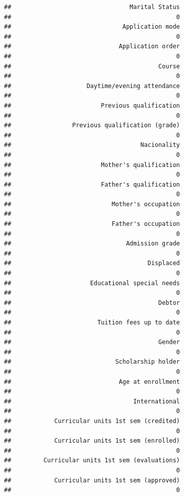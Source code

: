 \documentclass[
]{article}
\begin{document}
\begin{verbatim}
##                                 Marital Status 
##                                              0 
##                               Application mode 
##                                              0 
##                              Application order 
##                                              0 
##                                         Course 
##                                              0 
##                     Daytime/evening attendance 
##                                              0 
##                         Previous qualification 
##                                              0 
##                 Previous qualification (grade) 
##                                              0 
##                                    Nacionality 
##                                              0 
##                         Mother's qualification 
##                                              0 
##                         Father's qualification 
##                                              0 
##                            Mother's occupation 
##                                              0 
##                            Father's occupation 
##                                              0 
##                                Admission grade 
##                                              0 
##                                      Displaced 
##                                              0 
##                      Educational special needs 
##                                              0 
##                                         Debtor 
##                                              0 
##                        Tuition fees up to date 
##                                              0 
##                                         Gender 
##                                              0 
##                             Scholarship holder 
##                                              0 
##                              Age at enrollment 
##                                              0 
##                                  International 
##                                              0 
##            Curricular units 1st sem (credited) 
##                                              0 
##            Curricular units 1st sem (enrolled) 
##                                              0 
##         Curricular units 1st sem (evaluations) 
##                                              0 
##            Curricular units 1st sem (approved) 
##                                              0 

\end{verbatim}
\end{document}
